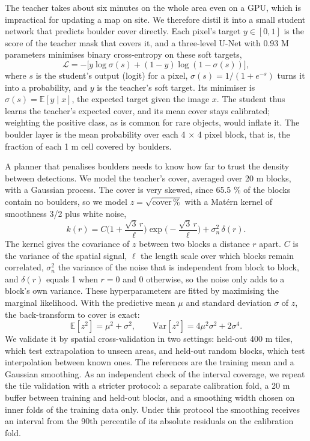 \documentclass[11pt,a4paper]{article}
\begin{document}
The teacher takes about six minutes on the whole area even on a GPU, which is impractical for updating a map on site. We therefore distil it \cite{Hinton2015} into a small student network that predicts boulder cover directly. Each pixel's target $y \in [0,1]$ is the score of the teacher mask that covers it, and a three-level U-Net with 0.93 M parameters minimises binary cross-entropy on these soft targets, \[\mathcal L = -\big[y \log \sigma(s) + (1-y)\log(1-\sigma(s))\big],\] where $s$ is the student's output (logit) for a pixel, $\sigma(s) = 1/(1 + e^{-s})$ turns it into a probability, and $y$ is the teacher's soft target. Its minimiser is $\sigma(s) = \mathbb E[y \mid x]$, the expected target given the image $x$. The student thus learns the teacher's expected cover, and its mean cover stays calibrated; weighting the positive class, as is common for rare objects, would inflate it. The boulder layer is the mean probability over each 4 $\times$ 4 pixel block, that is, the fraction of each 1 m cell covered by boulders.

A planner that penalises boulders needs to know how far to trust the density between detections. We model the teacher's cover, averaged over 20 m blocks, with a Gaussian process. The cover is very skewed, since 65.5 \% of the blocks contain no boulders, so we model $z = \sqrt{\text{cover}\,\%}$ with a Matérn kernel of smoothness 3/2 plus white noise, \[k(r) = C\Big(1 + \frac{\sqrt3\,r}{\ell}\Big)\exp\Big(-\frac{\sqrt3\,r}{\ell}\Big) + \sigma_n^2\,\delta(r).\] The kernel gives the covariance of $z$ between two blocks a distance $r$ apart. $C$ is the variance of the spatial signal, $\ell$ the length scale over which blocks remain correlated, $\sigma_n^2$ the variance of the noise that is independent from block to block, and $\delta(r)$ equals 1 when $r = 0$ and 0 otherwise, so the noise only adds to a block's own variance. These hyperparameters are fitted by maximising the marginal likelihood. With the predictive mean $\mu$ and standard deviation $\sigma$ of $z$, the back-transform to cover is exact: \[\mathbb E[z^2] = \mu^2 + \sigma^2,\qquad \mathrm{Var}[z^2] = 4\mu^2\sigma^2 + 2\sigma^4.\] We validate it by spatial cross-validation in two settings: held-out 400 m tiles, which test extrapolation to unseen areas, and held-out random blocks, which test interpolation between known ones. The references are the training mean and a Gaussian smoothing. As an independent check of the interval coverage, we repeat the tile validation with a stricter protocol: a separate calibration fold, a 20 m buffer between training and held-out blocks, and a smoothing width chosen on inner folds of the training data only. Under this protocol the smoothing receives an interval from the 90th percentile of its absolute residuals on the calibration fold.
\end{document}
